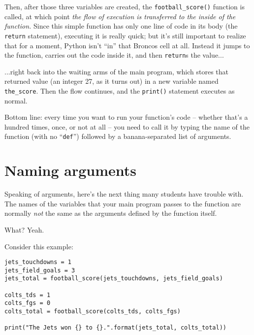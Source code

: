 Then, after those three variables are created, the \texttt{football\_score()}
function is called, at which point \textit{the flow of execution is transferred
to the inside of the function.} Since this simple function has only one line of
code in its body (the \texttt{return} statement), executing it is really quick;
but it's still important to realize that for a moment, Python isn't ``in'' that
Broncos cell at all. Instead it jumps to the function, carries out the code
inside it, and then \texttt{return}s the value...

...right back into the waiting arms of the main program, which stores that
returned value (an integer 27, as it turns out) in a new variable named
\texttt{the\_score}. Then the flow continues, and the \texttt{print()}
statement executes as normal.

Bottom line: every time you want to run your function's code -- whether that's
a hundred times, once, or not at all -- you need to call it by typing the name
of the function (with no ``\texttt{def}'') followed by a banana-separated list
of arguments.

\section{Naming arguments}


Speaking of arguments, here's the next thing many students have trouble with.
The names of the variables that your main program passes to the function are
normally \textit{not} the same as the arguments defined by the function itself.

What? Yeah.

Consider this example:


\begin{Verbatim}[fontsize=\small,samepage=true,frame=single,framesep=3mm]
jets_touchdowns = 1
jets_field_goals = 3
jets_total = football_score(jets_touchdowns, jets_field_goals)

colts_tds = 1
colts_fgs = 0
colts_total = football_score(colts_tds, colts_fgs)

print("The Jets won {} to {}.".format(jets_total, colts_total))
\end{Verbatim}
\vspace{-.2in}

